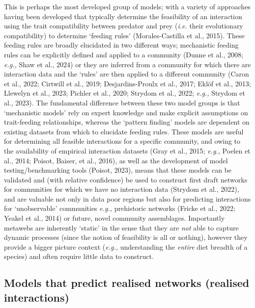 \documentclass[
]{article}
\begin{document}
This is perhaps the most developed group of models; with a variety of
approaches having been developed that typically determine the
feasibility of an interaction using the trait compatibility between
predator and prey (\emph{i.e.} their evolutionary compatibility) to
determine `feeding rules' (Morales-Castilla et al., 2015). These feeding
rules are broadly elucidated in two different ways; mechanistic feeding
rules can be explicitly defined and applied to a community (Dunne et
al., 2008; \emph{e.g.,} Shaw et al., 2024) or they are inferred from a
community for which there are interaction data and the `rules' are then
applied to a different community (Caron et al., 2022; Cirtwill et al.,
2019; Desjardins-Proulx et al., 2017; Eklöf et al., 2013; Llewelyn et
al., 2023; Pichler et al., 2020; Strydom et al., 2022; \emph{e.g.,}
Strydom et al., 2023). The fundamental difference between these two
model groups is that `mechanistic models' rely on expert knowledge and
make explicit assumptions on trait-feeding relationships, whereas the
`pattern finding' models are dependent on existing datasets from which
to elucidate feeding rules. These models are useful for determining all
feasible interactions for a specific community, and owing to the
availability of empirical interaction datasets (Gray et al., 2015;
\emph{e.g.,} Poelen et al., 2014; Poisot, Baiser, et al., 2016), as well
as the development of model testing/benchmarking tools (Poisot, 2023),
means that these models can be validated and (with relative confidence)
be used to construct first draft networks for communities for which we
have no interaction data (Strydom et al., 2022), and are valuable not
only in data poor regions but also for predicting interactions for
`unobservable' communities \emph{e.g.,} prehistoric networks (Fricke et
al., 2022; Yeakel et al., 2014) or future, novel community assemblages.
Importantly metawebs are inherently `static' in the sense that they are
\emph{not} able to capture dynamic processes (since the notion of
feasibility is all or nothing), however they provide a bigger picture
context (\emph{e.g.,} understanding the \emph{entire} diet breadth of a
species) and often require little data to construct.

\subsection{Models that predict realised networks (realised
interactions)}\label{models-that-predict-realised-networks-realised-interactions}
\end{document}
